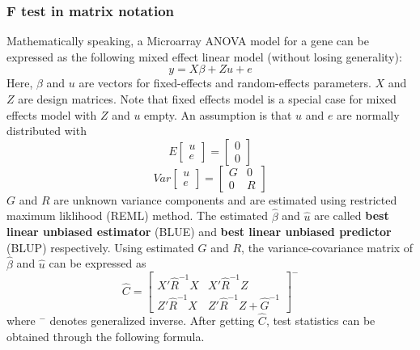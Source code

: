 \subsubsection{F test in matrix notation}
Mathematically speaking, 
a Microarray ANOVA model for a gene
can be expressed as the following mixed effect linear model 
(without losing generality):
\begin{equation}
\label{eq:mme}
y = X\beta + Zu + e
\end{equation}
Here, $\beta$ and $u$ are vectors for fixed-effects and random-effects 
parameters. $X$ and $Z$ are design matrices. Note that fixed effects
model is a special case for mixed effects model with $Z$ and $u$ empty.
An assumption is that $u$ and $e$ are normally distributed with 
\begin{equation}
E\left[\begin{array}{c}u\\e\end{array}\right] 
 = \left[\begin{array}{c}0\\0\end{array}\right]
\end{equation}
\begin{equation}
Var\left[\begin{array}{c}u\\e\end{array}\right] 
 = \left[\begin{array}{cc}G & 0\\0 & R\end{array}\right]
\end{equation}
$G$ and $R$ are unknown variance components and are estimated 
using restricted maximum liklihood (REML) method. The estimated 
$\hat{\beta}$ and $\hat{u}$ are called 
{\bf best linear unbiased estimator} (BLUE) and 
{\bf best linear unbiased predictor} (BLUP) respectively.
Using estimated $G$ and $R$, the variance-covariance 
matrix of $\hat{\beta}$ and $\hat{u}$ can be expressed as
\begin{equation}
\hat{C}=\left[\begin{array}{cc}X'\hat{R}^{-1}X & X'\hat{R}^{-1}Z \\
Z'\hat{R}^{-1}X & Z'\hat{R}^{-1}Z+\hat{G}^{-1}\end{array}\right]^-
\end{equation}
where $^{-}$ denotes generalized inverse. After getting $\hat{C}$,
test statistics can be obtained through the following formula. 
